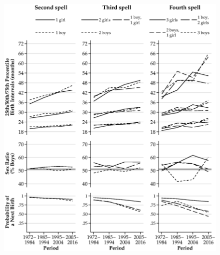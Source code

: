 \documentclass[12pt,letterpaper]{article}
\begin{document}
\begin{figure}
\centering
\includegraphics[width=\textwidth,height=\textheight,keepaspectratio=true]{bs_med_urban}
\end{figure}

\begin{figure}
\centering
\end{figure}
\end{document}
